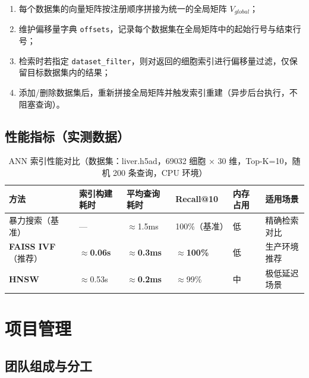 \documentclass[a4paper]{article}
\begin{document}
\begin{enumerate}
    \item 每个数据集的向量矩阵按注册顺序拼接为统一的全局矩阵 $V_{global}$；
    \item 维护偏移量字典 \texttt{offsets}，记录每个数据集在全局矩阵中的起始行号与结束行号；
    \item 检索时若指定 \texttt{dataset\_filter}，则对返回的细胞索引进行偏移量过滤，仅保留目标数据集内的结果；
    \item 添加/删除数据集后，重新拼接全局矩阵并触发索引重建（异步后台执行，不阻塞查询）。
\end{enumerate}

\subsection{性能指标（实测数据）}

\begin{table}[H]
\centering
\small
\caption{ANN 索引性能对比（数据集：liver.h5ad，69032 细胞 × 30 维，Top-K=10，随机 200 条查询，CPU 环境）}
\begin{tabularx}{\linewidth}{p{3cm}p{2.2cm}p{2.5cm}p{1.8cm}p{2cm}X}
\toprule
方法 & 索引构建耗时 & 平均查询耗时 & Recall@10 & 内存占用 & 适用场景 \\
\midrule
暴力搜索（基准） & — & $\approx$1.5ms & 100\%（基准） & 低 & 精确检索对比 \\
\textbf{FAISS IVF}（推荐） & \textbf{$\approx$0.06s} & \textbf{$\approx$0.3ms} & \textbf{$\approx$100\%} & 低 & 生产环境推荐 \\
\textbf{HNSW} & $\approx$0.53s & \textbf{$\approx$0.2ms} & $\approx$99\% & 中 & 极低延迟场景 \\
\bottomrule
\end{tabularx}
\end{table}

\section{项目管理}

\subsection{团队组成与分工}
\end{document}
